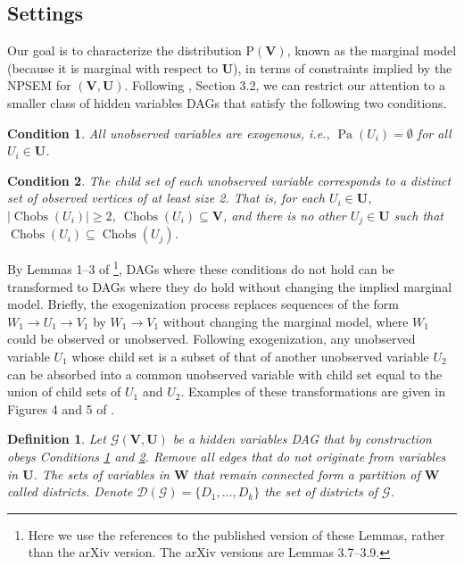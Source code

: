 \documentclass[12pt]{article}
\newtheorem{definition}{Definition}
\newtheorem{condition}{Condition}
\def\Pr{{\mathrm{P}}}
\DeclareMathOperator{\Chobs}{Chobs}
\newcommand{\bW}{\boldsymbol{W}}
\newcommand{\bU}{\boldsymbol{U}}
\newcommand{\bV}{\boldsymbol{V}}
\DeclareMathOperator{\Pa}{Pa}
\begin{document}
\subsection{Settings}
Our goal is to characterize the distribution $\Pr(\bV)$, known as the marginal model (because it is marginal with respect to $\bU$), in terms of constraints implied by the NPSEM for $(\bV,\bU)$. Following \citet{evans2016graphs}, Section 3.2, we can restrict our attention to a smaller class of hidden variables DAGs that satisfy the following two conditions.
\begin{condition} \label{A1}
All unobserved variables are exogenous, i.e., $\Pa(U_i) = \emptyset$ for all $U_i \in \bU$.
\end{condition}

\begin{condition} \label{A2}
The child set of each unobserved variable corresponds to a distinct
set of observed vertices of at least size 2. That is, for each $U_i \in \bU$, $|\Chobs(U_i)| \geq 2$, $\Chobs(U_i) \subseteq \bV$, and there is no other $U_j \in \bU$ such that $\Chobs(U_i) \subseteq \Chobs(U_j)$.
\end{condition}

By Lemmas 1--3 of \citet{evans2016graphs}\footnote{Here we use the references to the published version of these Lemmas, rather than the arXiv version. The arXiv versions are Lemmas 3.7--3.9.}, DAGs where these conditions do not hold can be transformed to DAGs where they do hold without changing the implied marginal model. Briefly, the exogenization process replaces sequences of the form $W_1 \rightarrow U_1 \rightarrow V_1$ by $W_1 \rightarrow V_1$ without changing the marginal model, where $W_1$ could be observed or unobserved. Following exogenization, any unobserved variable $U_1$ whose child set is a subset of that of another unobserved variable $U_2$ can be absorbed into a common unobserved variable with child set equal to the union of child sets of $U_1$ and $U_2$. Examples of these transformations are given in Figures 4 and 5 of \citet{evans2016graphs}.



\begin{definition} \label{def:districts}
Let $\mathcal{G}(\bV, \bU)$ be a hidden variables DAG that by construction obeys Conditions \ref{A1} and \ref{A2}. Remove all edges that do not originate from variables in $\bU$. The sets of variables in $\bW$ that remain connected form a partition of $\bW$ called \emph{districts}. Denote $\mathcal{D}(\mathcal{G}) = \{D_1, \ldots, D_k\}$ the set of districts of $\mathcal{G}$. 
\end{definition}
\end{document}
